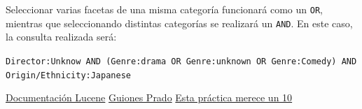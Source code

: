 \begin{itemize}
Seleccionar varias facetas de una misma categoría funcionará como un \texttt{OR}, mientras que seleccionando distintas categorías se realizará un \texttt{AND}. En este caso, la consulta realizada será:

\texttt{Director:Unknow AND (Genre:drama OR Genre:unknown OR Genre:Comedy) AND Origin/Ethnicity:Japanese}



\end{itemize}


\newpage
\begin{thebibliography}{9}
	
	\href{}{Documentación Lucene}
	\href{}{Guiones Prado}
	\href{}{Esta práctica merece un 10}
	
	
	
	
\end{thebibliography}

	
